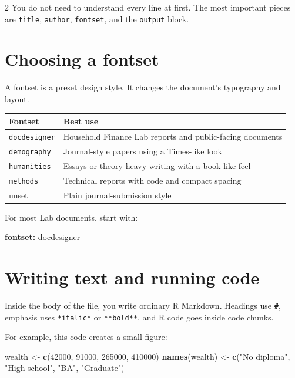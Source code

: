 \documentclass[12pt]{article}
\newenvironment{Shaded}{\begin{snugshade}}{\end{snugshade}}
\newcommand{\AttributeTok}[1]{\textcolor[rgb]{0.13,0.29,0.53}{#1}}
\newcommand{\DecValTok}[1]{\textcolor[rgb]{0.00,0.00,0.81}{#1}}
\newcommand{\FunctionTok}[1]{\textcolor[rgb]{0.13,0.29,0.53}{\textbf{#1}}}
\newcommand{\KeywordTok}[1]{\textcolor[rgb]{0.13,0.29,0.53}{\textbf{#1}}}
\newcommand{\NormalTok}[1]{#1}
\newcommand{\OtherTok}[1]{\textcolor[rgb]{0.56,0.35,0.01}{#1}}
\newcommand{\StringTok}[1]{\textcolor[rgb]{0.31,0.60,0.02}{#1}}
\renewenvironment{Shaded}{%
    \vspace{3pt}%
    \noindent\begin{minipage}{\linewidth}%
    \def\FrameCommand{%
      \hspace{1pt}%
      {\color{docdesignerrule}\vrule width 3pt}%
      \hspace{4pt}%
      \colorbox{codeinputbg}%
    }%
    \MakeFramed{\advance\hsize by -\width \FrameRestore}%
    \footnotesize
    \setlength{\parskip}{0pt}%
    \setlength{\partopsep}{0pt}%
  }{%
    \endMakeFramed
    \end{minipage}%
    \vspace{3pt}%
  }
\def\FrameCommand{\fboxsep=4pt\colorbox{codeoutputbg}}%
\begin{document}
\begin{multicols}{2}
You do not need to understand every line at first. The most important
pieces are \texttt{title}, \texttt{author}, \texttt{fontset}, and the
\texttt{output} block.

\section{Choosing a fontset}\label{choosing-a-fontset}

A fontset is a preset design style. It changes the document's typography
and layout.

{\def\LTcaptype{} %
\begin{longtable}[]{@{}ll@{}}
\toprule\noalign{}
Fontset & Best use \\
\midrule\noalign{}
\endhead
\bottomrule\noalign{}
\endlastfoot
\texttt{docdesigner} & Household Finance Lab reports and public-facing
documents \\
\texttt{demography} & Journal-style papers using a Times-like look \\
\texttt{humanities} & Essays or theory-heavy writing with a book-like
feel \\
\texttt{methods} & Technical reports with code and compact spacing \\
unset & Plain journal-submission style \\
\end{longtable}
}

For most Lab documents, start with:

\begin{Shaded}
\begin{Highlighting}[]
\FunctionTok{fontset}\KeywordTok{:}\AttributeTok{ docdesigner}
\end{Highlighting}
\end{Shaded}

\section{Writing text and running
code}\label{writing-text-and-running-code}

Inside the body of the file, you write ordinary R Markdown. Headings use
\texttt{\#}, emphasis uses \texttt{*italic*} or \texttt{**bold**}, and R
code goes inside code chunks.

For example, this code creates a small figure:

\begin{Shaded}
\begin{Highlighting}[]
\NormalTok{wealth }\OtherTok{\textless{}{-}} \FunctionTok{c}\NormalTok{(}\DecValTok{42000}\NormalTok{, }\DecValTok{91000}\NormalTok{, }\DecValTok{265000}\NormalTok{, }\DecValTok{410000}\NormalTok{)}
\FunctionTok{names}\NormalTok{(wealth) }\OtherTok{\textless{}{-}} \FunctionTok{c}\NormalTok{(}\StringTok{"No diploma"}\NormalTok{, }\StringTok{"High school"}\NormalTok{, }\StringTok{"BA"}\NormalTok{, }\StringTok{"Graduate"}\NormalTok{)}


\end{Highlighting}
\end{Shaded}
\end{multicols}
\end{document}
